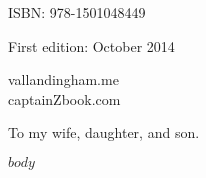 \documentclass[12pt]{extbook}
\newcommand\blankpage{%
    \null
    \thispagestyle{empty}%
    \addtocounter{page}{-1}%
    \newpage}
\begin{document}
  ISBN: 978-1501048449

  First edition: October 2014

  \vfill
  vallandingham.me\\
  captainZbook.com
  \vspace*{2\baselineskip}
  \clearpage
  \endgroup

  \begingroup
  \vspace*{\fill}
  \begin{center}
  To my wife, daughter, and son.
  \end{center}
  \vspace*{\fill}
  \afterpage{\blankpage}
  \endgroup
  \setcounter{page}{0}
  \clearpage
  

  
  \pagestyle{fancy}

  $body$
\end{document}
